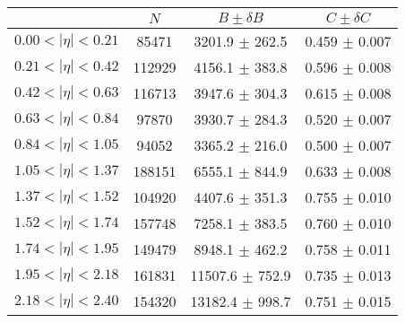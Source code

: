 \begin{tabular}{lccc}
\hline
    &   $N$   & $B \pm \delta B$  &  $C \pm \delta C$ \\
\hline
$0.00 < |\eta| <0.21$          & 85471      & 3201.9     $\pm$ 262.5 & 0.459      $\pm$ 0.007 \\
$0.21 < |\eta| <0.42$          & 112929     & 4156.1     $\pm$ 383.8 & 0.596      $\pm$ 0.008 \\
$0.42 < |\eta| <0.63$          & 116713     & 3947.6     $\pm$ 304.3 & 0.615      $\pm$ 0.008 \\
$0.63 < |\eta| <0.84$          & 97870      & 3930.7     $\pm$ 284.3 & 0.520      $\pm$ 0.007 \\
$0.84 < |\eta| <1.05$          & 94052      & 3365.2     $\pm$ 216.0 & 0.500      $\pm$ 0.007 \\
$1.05 < |\eta| <1.37$          & 188151     & 6555.1     $\pm$ 844.9 & 0.633      $\pm$ 0.008 \\
$1.37 < |\eta| <1.52$          & 104920     & 4407.6     $\pm$ 351.3 & 0.755      $\pm$ 0.010 \\
$1.52 < |\eta| <1.74$          & 157748     & 7258.1     $\pm$ 383.5 & 0.760      $\pm$ 0.010 \\
$1.74 < |\eta| <1.95$          & 149479     & 8948.1     $\pm$ 462.2 & 0.758      $\pm$ 0.011 \\
$1.95 < |\eta| <2.18$          & 161831     & 11507.6    $\pm$ 752.9 & 0.735      $\pm$ 0.013 \\
$2.18 < |\eta| <2.40$          & 154320     & 13182.4    $\pm$ 998.7 & 0.751      $\pm$ 0.015 \\
\hline
\end{tabular}
